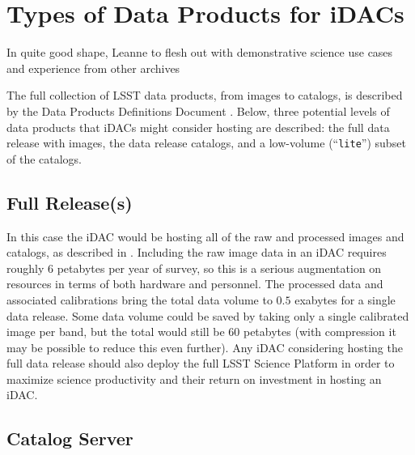 \section{Types of Data Products for iDACs}\label{sec:data}

 {\color{red} In quite good shape, Leanne to flesh out with demonstrative science use cases and experience from other archives} \newline

The full collection of LSST data products, from images to catalogs, is described by the Data Products Definitions Document . Below, three potential levels of data products that iDACs might consider hosting are described: the full data release with images, the data release catalogs, and a low-volume (``{\tt lite}'') subset of the catalogs.

\subsection{Full Release(s)}

In this case the iDAC would be hosting all of the raw and processed images and catalogs, as described in . Including the raw image data in an iDAC requires roughly $6$ petabytes per year of survey, so this is a serious augmentation on resources in terms of both hardware and personnel. The processed data and associated calibrations bring the total data volume to $0.5$ exabytes for a single data release. Some data volume could be saved by taking only a single calibrated image per band, but the total would still be $60$ petabytes (with compression it may be possible to reduce this even further). Any iDAC considering hosting the full data release should also deploy the full LSST Science Platform  in order to maximize science productivity and their return on investment in hosting an iDAC.

\subsection{Catalog Server}

